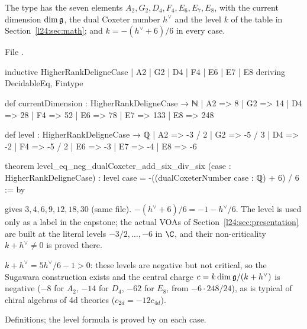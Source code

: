 \begin{definition}\label{l24:def:case}
The type  has the seven elements $A_2,G_2,D_4,F_4,E_6,E_7,E_8$, with the current
dimension $\dim\mathfrak g$, the dual Coxeter number $h^\vee$ and the level $k$ of the table in
Section~\ref{l24:sec:math}; and $k=-(h^\vee+6)/6$ in every case.
\end{definition}
\noindent File .
\begin{leancode}
inductive HigherRankDeligneCase
  | A2
  | G2
  | D4
  | F4
  | E6
  | E7
  | E8
  deriving DecidableEq, Fintype

def currentDimension : HigherRankDeligneCase → ℕ
  | A2 => 8
  | G2 => 14
  | D4 => 28
  | F4 => 52
  | E6 => 78
  | E7 => 133
  | E8 => 248

def level : HigherRankDeligneCase → ℚ
  | A2 => -3 / 2
  | G2 => -5 / 3
  | D4 => -2
  | F4 => -5 / 2
  | E6 => -3
  | E7 => -4
  | E8 => -6

theorem level_eq_neg_dualCoxeter_add_six_div_six
    (case : HigherRankDeligneCase) :
    level case = -((dualCoxeterNumber case : ℚ) + 6) / 6 := by
\end{leancode}

\begin{dictionary}
 gives $3,4,6,9,12,18,30$ (same file). $-(h^\vee+6)/6=-1-h^\vee/6$. The level
is used only as a label in the capstone; the actual VOAs of Section~\ref{l24:sec:presentation} are built at
the literal levels $-3/2,\dots,-6$ in $\C$, and their non-criticality $k+h^\vee\neq0$ is proved there.
\end{dictionary}

\begin{physics}
$k+h^\vee=5h^\vee/6-1>0$: these levels are negative but not critical, so the Sugawara construction exists
and the central charge $c=k\dim\mathfrak g/(k+h^\vee)$ is negative ($-8$ for $A_2$, $-14$ for $D_4$,
$-62$ for $E_8$, from $-6\cdot248/24$), as is typical of chiral algebras of 4d theories ($c_{2d}=-12c_{4d}$).
\end{physics}

\begin{status}
Definitions; the level formula is proved by  on each case.
\end{status}

